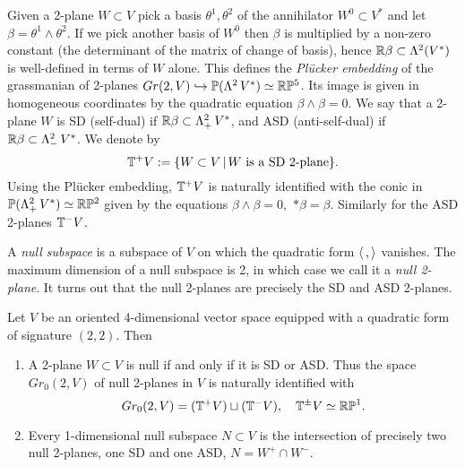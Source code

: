 Given a 2-plane $W\subset V$ pick a basis $\theta^1, \theta^2$  of the annihilator $W^0\subset V^*$ and  let $\beta=\theta^1\wedge\theta^2$. If we pick another basis of $W^0$ then $\beta $ is multiplied by a non-zero constant (the determinant of the matrix of change of basis), hence $\mathbb{R}\beta\subset \Lambda^2(V^*)$ is well-defined in terms of $W$ alone. This defines the {\em Pl\"ucker embedding}  of the grassmanian of 2-planes $Gr(2,V)\hookrightarrow\mathbb{P}(\Lambda^2\,V^*)\simeq \mathbb{R}\mathbb{P}^5$. Its  image is given in homogeneous coordinates by the quadratic equation $\beta\wedge\beta=0$. We say that a 2-plane $W$ is SD (self-dual) if $\mathbb{R}\beta\subset \Lambda^2_+\,V^*$, and ASD (anti-self-dual)  if $\mathbb{R}\beta\subset \Lambda^2_-\,V^*$. We denote by 
 $$\mathbb{T}^+V:=\{W\subset V\, | \, W\hbox{ is a SD 2-plane}\}.$$
Using the Pl\"ucker embedding,  $\mathbb{T}^+V$   is naturally  identified  with the conic in $\mathbb{P}(\Lambda^2_+\,V^*)\simeq\mathbb{R}\mathbb{P}^2$  given by the equations $\beta\wedge\beta=0,$ $*\beta=\beta.$ Similarly for the ASD 2-planes $\mathbb{T}^-V$.  



A {\em null subspace}  is a subspace of $V$ on which the quadratic form $\langle\,, \rangle$ vanishes. The maximum dimension of a null subspace is 2, in which case we call it a {\em null 2-plane}. It turns out that the null 2-planes are precisely the SD and ASD 2-planes. 



\begin{proposition}\label{Nine} Let $V$ be an oriented 4-dimensional vector space  equipped with a quadratic form of signature $(2,2)$. Then 
\begin{enumerate}[leftmargin=*]\setlength\itemsep{5pt}
\item A 2-plane  $W\subset V$ is null if and only if it is  SD or ASD. Thus the space $Gr_0(2, V)$ of null 2-planes in $V$ is naturally identified with 
$$Gr_0(2,V)=(\mathbb{T}^+V)\sqcup(\mathbb{T}^- V),\quad \mathbb{T}^\pm V\simeq \mathbb{R}\mathbb{P}^1.$$
\item 
Every  1-dimensional null subspace $N\subset V$  is the intersection of  precisely two null 2-planes, one SD and one ASD, $N=W^+\cap W^-.$  

\end{enumerate}
\end{proposition}

